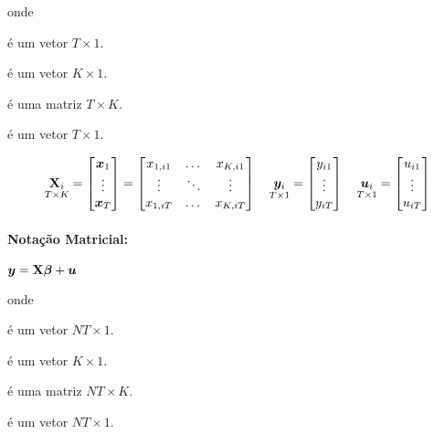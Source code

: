 \documentclass[11pt, oneside, a4paper, article]{article}
\numberwithin{equation}{section}
\begin{document}
\noindent onde
\vspace{-1 ex}
\begin{description}[noitemsep]
	\item[$\yvec_{i}$] é um vetor $T \times 1$.
	\item[$\betavec$] é um vetor $K \times 1$.
	\item[$\Xmat_{i}$] é uma matriz $T \times K$.
	\item[$\uvec_{it}$] é um vetor $T \times 1$.
\end{description}

\vspace{-1 em}
\begin{align*}
	\underset{T \times K}{\mathbf{X}_{i}} = 
	\begin{bmatrix}
		\boldsymbol{x}_{1} \\ \vdots \\ \boldsymbol{x}_{T}
	\end{bmatrix}
	=
	\begin{bmatrix}
		x_{1,i1} & \dots  & x_{K, i1}	\\
		\vdots          & \ddots &  \vdots \\
		x_{1,iT} & \dots  & x_{K, iT}
	\end{bmatrix}
	\quad
	\underset{T \times 1}{\boldsymbol{y}_{i}} = 
	\begin{bmatrix}
		y_{i1} \\ \vdots \\ y_{iT}
	\end{bmatrix}
	\quad
	\underset{T \times 1}{\boldsymbol{u}_{i}} = 
	\begin{bmatrix}
		u_{i1} \\ \vdots \\ u_{iT}
	\end{bmatrix}
\end{align*}

\paragraph{Notação Matricial:}
$\boldsymbol{y} = \mathbf{X} \boldsymbol{\beta} + \boldsymbol{u}$

\noindent onde
\vspace{-1 ex}
\begin{description}[noitemsep]
	\item[$\yvec$] é um vetor $NT \times 1$.
	\item[$\betavec$] é um vetor $K \times 1$.
	\item[$\Xmat$] é uma matriz $NT \times K$.
	\item[$\uvec$] é um vetor $NT \times 1$.
\end{description}
\end{document}
